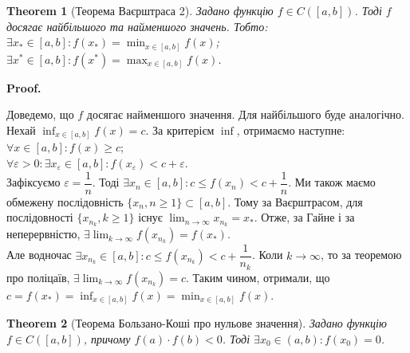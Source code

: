 \documentclass[a4paper, 14pt]{article}
\makeatletter
\def\qed{$\blacksquare$}
\theoremstyle{theoremdd}
\newtheorem{theorem}{Theorem}[subsection]
\theoremstyle{theoremdd}
\theoremstyle{theoremdd}
\theoremstyle{theoremdd}
\theoremstyle{theoremdd}
\theoremstyle{theoremdd}
\theoremstyle{theoremdd}
\theoremstyle{theoremdd}
\renewenvironment{proof}[1][Proof.\\]{\par
\pushQED{\hfill \qed}%
\normalfont \topsep6\p@\@plus6\p@\relax
\trivlist
\item\relax
{\bfseries
#1\@addpunct{.}}\hspace\labelsep\ignorespaces
}{%
\popQED\endtrivlist\@endpefalse
}
\makeatother
\begin{document}
\begin{theorem}[Теорема Ваєрштраса 2]
Задано функцію $f \in C([a,b])$. Тоді $f$ досягає найбільшого та найменшого значень. Тобто:\\
$\displaystyle \exists x_* \in [a,b]: f(x_*) = \min_{x \in [a,b]} f(x)$;\\
$\displaystyle \exists x^* \in [a,b]: f(x^*) = \max_{x \in [a,b]} f(x)$.
\end{theorem}

\begin{proof}
Доведемо, що $f$ досягає найменшого значення. Для найбільшого буде аналогічно.\\
Нехай $\displaystyle \inf_{x \in [a,b]} f(x) = c$. За критерієм $\inf$, отримаємо наступне:\\
$\forall x \in [a,b]: f(x) \geq c$;\\
$\forall \varepsilon > 0: \exists x_{\varepsilon} \in [a,b]: f(x_{\varepsilon}) < c + \varepsilon$.\\
Зафіксуємо $\varepsilon = \dfrac{1}{n}$. Тоді $\exists x_n \in [a,b]: c \leq f(x_n) < c + \dfrac{1}{n}$. Ми також маємо обмежену послідовність $\{x_n, n \geq 1\} \subset [a,b]$. Тому за Ваєрштрасом, для послідовності $\{x_{n_k},k \geq 1\}$ існує $\displaystyle \lim_{n \to \infty} x_{n_k} = x_*$. Отже, за Гайне і за неперервністю, $\displaystyle \exists \lim_{k \to \infty} f(x_{n_k}) = f(x_*)$.\\
Але водночас $\exists x_{n_k} \in [a,b]: c \leq f(x_{n_k}) < c + \dfrac{1}{n_k}$. Коли $k \to \infty$, то за теоремою про поліцаїв, $\exists \displaystyle \lim_{k \to \infty} f(x_{n_k}) = c$. Таким чином, отримали, що $c = f(x_*) = \displaystyle \inf_{x \in [a,b]} f(x) = \min_{x \in [a,b]} f(x)$.
\end{proof}

\begin{theorem}[Теорема Бользано-Коші про нульове значення]
Задано функцію $f \in C([a,b])$, причому $f(a) \cdot f(b) < 0$. Тоді $\exists x_0 \in (a,b): f(x_0) = 0$.
\\ %
\end{theorem}
\end{document}
